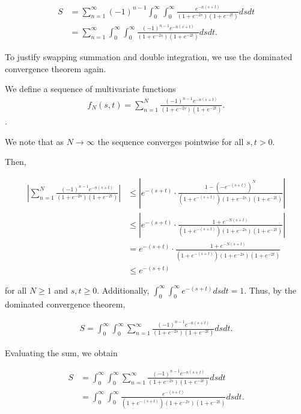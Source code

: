\documentclass{article}
\begin{document}
\begin{align*}
    S &= \sum_{n=1}^{\infty}(-1)^{n-1}\int_{0}^{\infty}\int_{0}^{\infty}\frac{e^{-n(s+t)}}{(1+e^{-2s})(1+e^{-2t})}dsdt\\
     &= \sum_{n=1}^{\infty}\int_{0}^{\infty}\int_{0}^{\infty}\frac{(-1)^{n-1}e^{-n(s+t)}}{(1+e^{-2s})(1+e^{-2t})}dsdt.
\end{align*}

\vspace{5mm}

To justify swapping summation and double integration, we use the dominated convergence theorem again. 

\vspace{5mm}

We define a sequence of multivariate functions
\begin{align*}
    f_N(s, t)=\sum_{n=1}^{N}\frac{(-1)^{n-1}e^{-n(s+t)}}{(1+e^{-2s})(1+e^{-2t})}.
\end{align*}.

We note that as $N \to \infty$ the sequence converges pointwise for all $s,t>0$.

\vspace{5mm}

Then,

\begin{align*}
    \left|\sum_{n=1}^{N}\frac{(-1)^{n-1}e^{-n(s+t)}}{(1+e^{-2s})(1+e^{-2t})}\right| &\leq \left|e^{-(s+t)}\cdot\frac{1-\left(-e^{-(s+t)}\right)^N}{(1+e^{-(s+t)})(1+e^{-2s})(1+e^{-2t})}\right| \\
    &\leq \left|e^{-(s+t)}\cdot\frac{1+e^{-N(s+t)}}{(1+e^{-(s+t)})(1+e^{-2s})(1+e^{-2t})}\right| \\ &= e^{-(s+t)}\cdot\frac{1+e^{-N(s+t)}}{(1+e^{-(s+t)})(1+e^{-2s})(1+e^{-2t})} \\ &\leq e^{-(s+t)}
\end{align*}

for all $N \geq 1$ and $s,t \geq 0$. Additionally, $\int_{0}^{\infty}\int_{0}^{\infty}e^{-(s+t)}dsdt=1$. Thus, by the dominated convergence theorem,

\begin{align*}
    S = \int_{0}^{\infty}\int_{0}^{\infty}\sum_{n=1}^{\infty}\frac{(-1)^{n-1}e^{-n(s+t)}}{(1+e^{-2s})(1+e^{-2t})}dsdt.
\end{align*}
\vspace{5mm}

Evaluating the sum, we obtain

\begin{align*}
    S &= \int_{0}^{\infty}\int_{0}^{\infty}\sum_{n=1}^{\infty}\frac{(-1)^{n-1}e^{-n(s+t)}}{(1+e^{-2s})(1+e^{-2t})}dsdt\\
    &= \int_{0}^{\infty}\int_{0}^{\infty}\frac{e^{-(s+t)}}{(1+e^{-(s+t)})(1+e^{-2s})(1+e^{-2t})}dsdt.
\end{align*}
\end{document}
